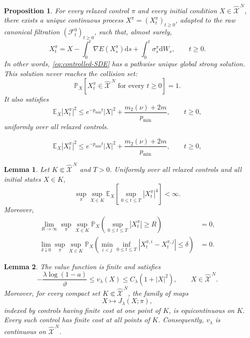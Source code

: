 \documentclass[10pt,a4paper]{amsart}
\newtheorem{proposition}{Proposition}
\newtheorem{lemma}{Lemma}
\def\E{\mathbb{E}}
\def\Fc{{\mathcal F}}
\def\P{\mathbb{P}}
\def\Xc{{\mathcal X}}
\newcommand{\dd}{\mathrm{d}}
\def\hX{\widehat{\Xc}^{\,N}}
\newcommand{\pmin}{p_{\min}}
\begin{document}
\begin{proposition}\label{prop:controlled-dynamics}
For every relaxed control $\pi$ and every initial condition $X\in\hX$, there exists a unique
continuous process $X^\pi=(X_t^\pi)_{t\ge0}$, adapted to the raw canonical filtration
$(\Fc_t^0)_{t\ge0}$, such that, almost surely,
\begin{equation}\label{eq:controlled-integral-form}
 X_t^\pi
 =X-\int_0^t\nabla E(X_s^\pi)\dd s
 +\int_0^t\sigma_s^\pi\dd W_s,
 \qquad t\ge0.
\end{equation}
In other words, \eqref{eq:controlled-SDE} has a pathwise unique global strong solution.  This
solution never reaches the collision set:
\begin{equation}\label{eq:no-collision-control}
 \P_X\left[X_t^\pi\in\hX\text{ for every }t\ge0\right]=1.
\end{equation}
It also satisfies
\begin{equation}\label{eq:moment-controlled}
 \E_X|X_t^\pi|^2
 \le e^{-\pmin t}|X|^2+
 \frac{m_2(\nu)+2m}{\pmin},
 \qquad t\ge0,
\end{equation}
uniformly over all relaxed controls.
\end{proposition}

\begin{equation}
 \E_X|X_t^\pi|^2
 \le e^{-\pmin t}|X|^2+
 \frac{m_2(\nu)+2m}{\pmin},
 \qquad t\ge0,
\end{equation}

\begin{lemma}\label{lem:uniform-localization-control}
Let $K\Subset\hX$ and $T>0$.  Uniformly over all relaxed controls and all initial states $X\in K$,
\begin{equation}\label{eq:uniform-fourth-moment-control}
 \sup_{\pi}\sup_{X\in K}
 \E_X\left[\sup_{0\le t\le T}|X_t^\pi|^4\right]<\infty.
\end{equation}
Moreover,
\begin{align}
 \lim_{R\to\infty}\sup_{\pi}\sup_{X\in K}
 \P_X\left(\sup_{0\le t\le T}|X_t^\pi|\ge R\right)&=0,
 \label{eq:uniform-no-escape-control}\\
 \lim_{\delta\downarrow0}\sup_{\pi}\sup_{X\in K}
 \P_X\left(\min_{i<j}\inf_{0\le t\le T}
 |X_t^{\pi,i}-X_t^{\pi,j}|\le\delta\right)&=0.
 \label{eq:uniform-no-near-collision-control}
\end{align}
\end{lemma}

\begin{lemma}\label{lem:value-continuity}
The value function is finite and satisfies
\begin{equation}\label{eq:value-growth}
 -\frac{\lambda\log(1-a)}{\vartheta}
 \le v_\lambda(X)\le C_\lambda(1+|X|^2),
 \qquad X\in\hX.
\end{equation}
Moreover, for every compact set $K\Subset\hX$, the family of maps
\[
 X\longmapsto J_\lambda(X;\pi),
\]
indexed by controls having finite cost at one point of $K$, is equicontinuous on $K$.  Every such
control has finite cost at all points of $K$.  Consequently, $v_\lambda$ is continuous on $\hX$.
\end{lemma}
\end{document}
